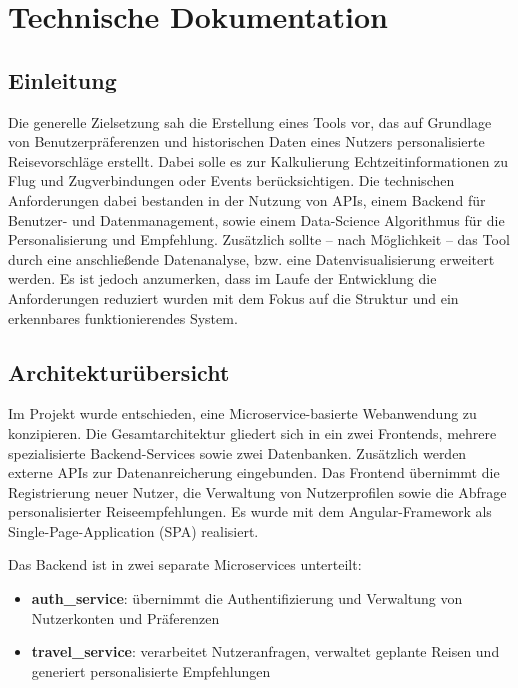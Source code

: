 \section{Technische Dokumentation}

\subsection{Einleitung}

Die generelle Zielsetzung sah die Erstellung eines Tools vor, das auf Grundlage von Benutzerpräferenzen und historischen Daten eines Nutzers personalisierte Reisevorschläge erstellt. Dabei solle es zur Kalkulierung Echtzeitinformationen zu Flug und Zugverbindungen oder Events berücksichtigen. 
Die technischen Anforderungen dabei bestanden in der Nutzung von APIs, einem Backend für Benutzer- und Datenmanagement, sowie einem Data-Science Algorithmus für die Personalisierung und Empfehlung.  
Zusätzlich sollte – nach Möglichkeit – das Tool durch eine anschließende Datenanalyse, bzw. eine Datenvisualisierung erweitert werden.  
Es ist jedoch anzumerken, dass im Laufe der Entwicklung die Anforderungen reduziert wurden mit dem Fokus auf die Struktur und ein erkennbares funktionierendes System.

\subsection{Architekturübersicht}

Im Projekt wurde entschieden, eine Microservice-basierte Webanwendung zu konzipieren. Die Gesamtarchitektur gliedert sich in ein zwei Frontends, mehrere spezialisierte Backend-Services sowie zwei Datenbanken. Zusätzlich werden externe APIs zur Datenanreicherung eingebunden.  
Das Frontend übernimmt die Registrierung neuer Nutzer, die Verwaltung von Nutzerprofilen sowie die Abfrage personalisierter Reiseempfehlungen. Es wurde mit dem Angular-Framework als Single-Page-Application (SPA) realisiert.  

Das Backend ist in zwei separate Microservices unterteilt:
\begin{itemize}
  \item \textbf{auth\_service}: übernimmt die Authentifizierung und Verwaltung von Nutzerkonten und Präferenzen
  \item \textbf{travel\_service}: verarbeitet Nutzeranfragen, verwaltet geplante Reisen und generiert personalisierte Empfehlungen
\end{itemize}


